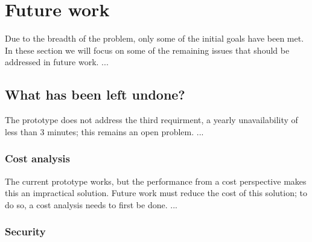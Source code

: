 

\section{Future work}
\label{sec:futureWork}










Due to the breadth of the problem, only some of the initial goals have been
met. In these section we will focus on some of the remaining issues that
should be addressed in future work. ...


\subsection{What has been left undone?}
\label{what-has-been-left-undone}


The prototype does not address the third requirment, \ie a yearly unavailability of less than 3 minutes; this remains an open problem. ...


\subsubsection{Cost analysis}




The current prototype works, but the performance from a cost perspective makes this an impractical solution. Future work must reduce the cost of this solution; to do so, a cost analysis needs to first be done. ...


\subsubsection{Security}


